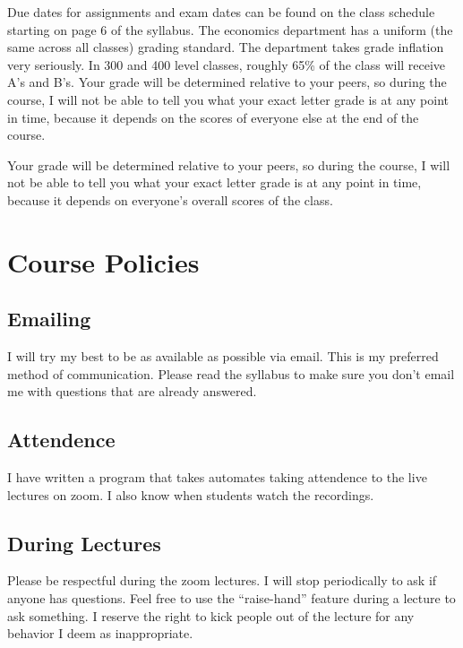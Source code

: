 \documentclass[11pt]{article}
\begin{document}
Due dates for assignments and exam dates can be found on the class schedule starting on page 6 of the syllabus. The economics department has a uniform (the same across all classes) grading standard.  The department takes grade inflation very seriously. In 300 and 400 level classes, roughly 65\% of the class will receive A's and B's. Your grade will be determined relative to your peers, so during the course, I will not be able to tell you what your exact letter grade is at any point in time, because it depends on the scores of everyone else at the end of the course.

Your grade will be determined relative to your peers, so during the course, I will not be able to tell you what your exact letter grade is at any point in time, because it depends on everyone’s overall scores of the class.

	
	
	
	\section*{Course Policies}
	
	\subsection*{Emailing}
	
	I will try my best to be as available as possible via email. This is my preferred method of communication. Please read the syllabus to make sure you don't email me with questions that are already answered.
	
	\subsection*{Attendence}
	
	I have written a program that takes automates taking attendence to the live lectures on zoom. I also know when students watch the recordings.
	
	\subsection*{During Lectures}
	
Please be respectful during the zoom lectures.  I will stop periodically to ask if anyone has questions. Feel free to use the ``raise-hand'' feature during a lecture to ask something. I reserve the right to kick people out of the lecture for any behavior I deem as inappropriate.  
	
\end{document}
